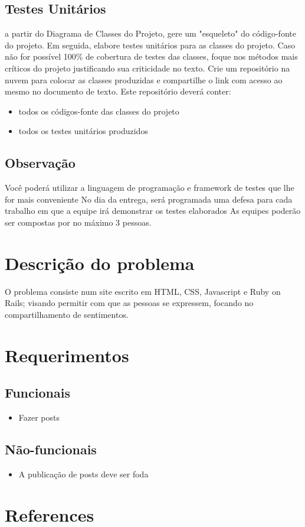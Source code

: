 \documentclass[12pt]{article}
\begin{document}
\subsection{Testes Unitários}
a partir do Diagrama de Classes do Projeto, gere um "esqueleto" do código-fonte do projeto. Em seguida, elabore testes unitários para as classes do projeto. Caso não for possível 100\% de cobertura de testes das classes, foque nos métodos mais críticos do projeto justificando sua criticidade no texto. Crie um repositório na nuvem para colocar as classes produzidas e compartilhe o link com acesso ao mesmo no documento de texto. Este repositório deverá conter:
\begin{itemize}
  \item todos os códigos-fonte das classes do projeto
  \item todos os testes unitários produzidos
\end{itemize}

\subsection{Observação} 
Você poderá utilizar a linguagem de programação e framework de testes que lhe for mais conveniente
No dia da entrega, será programada uma defesa para cada trabalho em que a equipe irá demonstrar os testes elaborados
As equipes poderão ser compostas por no máximo 3 pessoas.

\section{Descrição do problema} \label{sec:firstpage}

O problema consiste num site escrito em HTML, CSS, Javascript e Ruby on Rails; 
visando permitir com que as pessoas se expressem, focando no compartilhamento 
de sentimentos.

\section{Requerimentos}
\subsection{Funcionais}
\begin{itemize}
  \item Fazer posts
\end{itemize}
\subsection{Não-funcionais}
\begin{itemize}
  \item A publicação de posts deve ser foda
\end{itemize}

\section{References}



\end{document}
